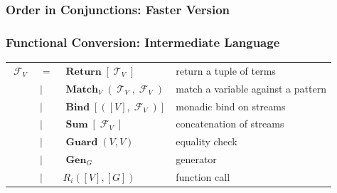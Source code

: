 \documentclass[xcolor=table]{beamer}
\DeclareMathOperator{\Term}{\mathcal{T}}
\DeclareMathOperator{\Fun}{\mathcal{F}}
\DeclareMathOperator{\Rtrn}{\mathbf{Return}}
\DeclareMathOperator{\Bind}{\mathbf{Bind}}
\DeclareMathOperator{\Match}{\mathbf{Match}}
\DeclareMathOperator{\Sum}{\mathbf{Sum}}
\DeclareMathOperator{\Guard}{\mathbf{Guard}}
\DeclareMathOperator{\Gen}{\mathbf{Gen}}
\newcommand{\LIST}[1]{\left[ #1 \right]}
\begin{document}
\begin{frame}[fragile]
  \frametitle{Order in Conjunctions: Faster Version}
  
\end{frame}

\begin{frame}[fragile]
  \frametitle{Functional Conversion: Intermediate Language}
\begin{tabular}{llll}
    $\Fun_{V}$ & $=$ &  $\Rtrn \LIST{\Term_{V}}$ & return a tuple of terms\\
               & $\mid$ &  $\Match_{V} \left( \Term_{V}, \Fun_{V} \right)$& match a variable against a pattern\\
               & $\mid$ & $\Bind\LIST{\left(\LIST{V}, \Fun_{V}\right)} $ & monadic bind on streams\\
               & $\mid$ & $\Sum\LIST{\Fun_{V}}$ & concatenation of streams\\
               & $\mid$ & $\Guard\left( V, V \right)$ & equality check\\
               & $\mid$ & $\Gen_{G}$ & generator\\
               & $\mid$ & $R_{i}(\LIST{V}, \LIST{G})$ & function call
\end{tabular}
\end{frame}
\end{document}
